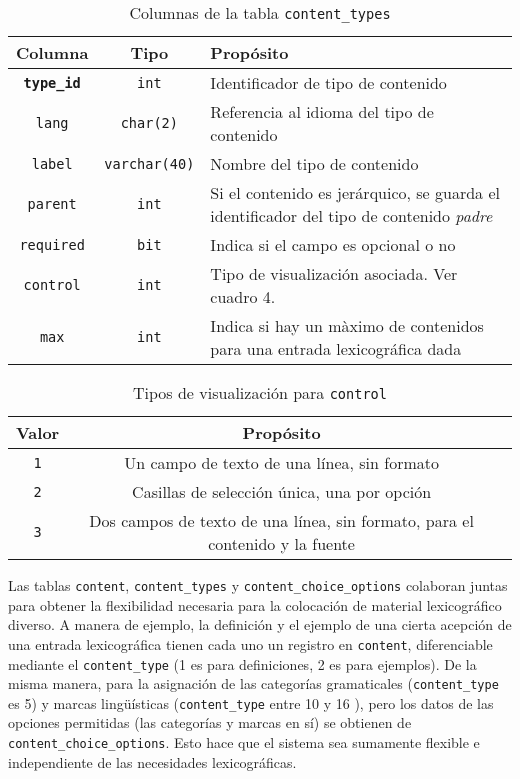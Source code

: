 \documentclass[11pt]{article} %
\begin{document}
\begin{table}
\centering
\begin{tabular}{ccp{6cm}} 
\toprule 
Columna & Tipo &Propósito \\ \midrule 
\texttt{\bf type\_id} &\texttt{int} & Identificador de tipo de contenido \\ 
\texttt{lang} & \texttt{char(2)} & Referencia al idioma del tipo de contenido\\ 
\texttt{label} & \texttt{varchar(40)} & Nombre del tipo de contenido \\ 
\texttt{parent} & \texttt{int} & Si el contenido es jerárquico, se guarda el identificador del tipo de contenido \textit{padre} \\
\texttt{required} & \texttt{bit} & Indica si el campo es opcional o no \\ 
\texttt{control} & \texttt{int} & Tipo de visualización asociada. Ver cuadro 4. \\ 
\texttt{max} & \texttt{int} & Indica si hay un màximo de contenidos para una entrada lexicográfica dada\\ 
\bottomrule 
\end{tabular}
\caption{Columnas de la tabla \texttt{content\_types}}
\end{table}

\begin{table}
\centering
\begin{tabular}{ccp{6cm}} 
\toprule 
Valor & Propósito \\ \midrule 
\texttt{1} & Un campo de texto de una línea, sin formato \\ 
\texttt{2} & Casillas de selección única, una por opción \\ 
\texttt{3} & Dos campos de texto de una línea, sin formato, para el contenido y la fuente \\ 
\bottomrule 
\end{tabular}
\caption{Tipos de visualización para \texttt{control}}
\end{table}

Las tablas \texttt{content}, \texttt{content\_types} y \texttt{content\_choice\_options} colaboran juntas para obtener la flexibilidad necesaria para la colocación de material lexicográfico diverso. A manera de ejemplo, la definición y el ejemplo de una cierta acepción de una entrada lexicográfica tienen cada uno un registro en \texttt{content}, diferenciable mediante el \texttt{content\_type} (1 es para definiciones, 2 es para ejemplos). De la misma manera, para la asignación de las categorías gramaticales (\texttt{content\_type} es 5) y marcas lingüísticas (\texttt{content\_type} entre 10 y 16 ), pero los datos de las opciones permitidas (las categorías y marcas en sí) se obtienen de \texttt{content\_choice\_options}. Esto hace que el sistema sea sumamente flexible e independiente de las necesidades lexicográficas.
\end{document}
